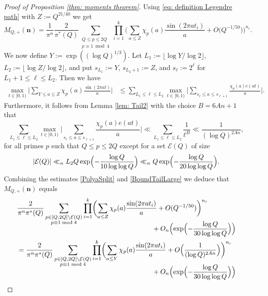 \documentclass[JEP,XML,SOM,Unicode,NoFloatCountersInSection,published]{cedram}
\theoremstyle{plain}
\theoremstyle{definition}
\newcommand{\un}{\boldsymbol{n}}
\begin{document}
\begin{proof}[Proof of Proposition \ref{thm: moments theorem}]
Using \eqref{eq: definition Legendre path} with $Z:= Q^{21/40}$ we get
\[
M_{Q, +}(\un)= \frac{1}{\pi^n} \frac{2}{\pi^*(Q)} \sum_{\substack{Q\leq p\leq 2Q\\ p\equiv 1\bmod 4}}\prod_{i=1}^k \biggl(\sum_{a\leq Z} \chi_p(a) \frac{\sin(2\pi at_i)}{a}+ O\bigl(Q^{-1/50}\bigr)\biggr)^{n_i}.
\]
We now define $Y:=\exp((\log Q)^{1/3})$.
Let $L_1:=\lfloor \log Y /\log 2\rfloor$, $L_2:= \lfloor \log Z/\log 2\rfloor$, and put $s_{L_1}:= Y$, $s_{L_2+1}:= Z$, and $s_{\ell}:=2^{\ell}$ for $L_1+1\leq \ell\leq L_2$.
Then we have
\begin{equation}\label{PolyaSplit}
\begin{aligned}
\max_{t\in [0, 1)} \biggl|\sum_{Y\leq a\leq Z} \chi_p(a) \frac{\sin(2\pi at)}{a}\biggr|
& \leq \sum_{L_1\leq \ell \leq L_2} \max_{t \in [0, 1)} \biggl|\sum_{s_{\ell}\leq a\leq s_{\ell+1}} \frac{\chi_p(a)e(at)}{a}\biggr|.
\end{aligned}
\end{equation}
Furthermore, it follows from Lemma \ref{lem: Tail2} with the choice $B=6An+1$ that
\begin{equation}\label{BoundTailLarge}
\sum_{L_1\leq \ell \leq L_2} \max_{t \in [0, 1)} \biggl|\sum_{s_{\ell}\leq a\leq s_{\ell+1}} \frac{\chi_p(a)e(at)}{a}\biggr|
\ll
\sum_{L_1\leq \ell \leq L_2} \frac{1}{\ell^B} \ll \frac{1}{(\log Q)^{2An}},
\end{equation}
for all primes $p$ such that $Q\leq p\leq 2Q$ except for a set $\mathcal{E}(Q)$ of size
\[
|\mathcal{E}(Q)| \ll_n L_2 Q \exp\Bigl(-\frac{\log Q }{10 \log\log Q}\Bigr) \ll_n Q \exp\Bigl(-\frac{\log Q}{20 \log\log Q}\Bigr).\]
Combining the estimates \eqref{PolyaSplit} and \eqref{BoundTailLarge} we deduce that $M_{Q, +}(\un)$ equals
\begin{align*}
&\frac{2}{\pi^n\pi^*(Q)} \sum_{\substack{p\in [Q, 2Q]\setminus \mathcal{E}(Q)\\ p\equiv 1\bmod 4}}\prod_{i=1}^k \biggl(\sum_{a\leq Z} \chi_p(a) \frac{\sin(2\pi at_i)}{a}+ O(Q^{-1/50})\biggl)^{n_i}\\[-10pt]
& \hspace*{7cm} + O_n\Bigl(\exp\Bigl(-\frac{\log Q}{30\log\log Q}\Bigr)\Bigr)\\
&= \frac{2}{\pi^n\pi^*(Q)} \sum_{\substack{p\in [Q, 2Q]\setminus \mathcal{E}(Q)\\ p\equiv 1\bmod 4}}\prod_{i=1}^k \biggl(\sum_{a\leq Y} \chi_p(a) \frac{\sin(2\pi at_i)}{a}+ O\Bigl(\frac{1}{(\log Q)^{2An}}\Bigr)\biggr)^{n_i}\\[-8pt]
& \hspace*{7cm} + O_n\Bigl(\exp\Bigl(-\frac{\log Q}{30\log\log Q}\Bigr)\Bigr)\\

\end{align*}
\end{proof}
\end{document}
